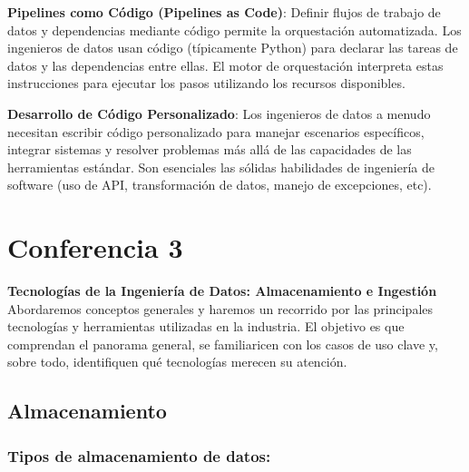 \documentclass[12pt]{book}
\begin{document}
\textbf{Pipelines como Código (Pipelines as Code)}: Definir flujos de trabajo de datos y dependencias mediante código permite la orquestación automatizada. Los ingenieros de datos usan código (típicamente Python) para declarar las tareas de datos y las dependencias entre ellas. El motor de orquestación interpreta estas instrucciones para ejecutar los pasos utilizando los recursos disponibles.

\textbf{Desarrollo de Código Personalizado}: Los ingenieros de datos a menudo necesitan escribir código personalizado para manejar escenarios específicos, integrar sistemas y resolver problemas más allá de las capacidades de las herramientas estándar. Son esenciales las sólidas habilidades de ingeniería de software (uso de API, transformación de datos, manejo de excepciones, etc).
\chapter{Conferencia 3}
\normalfont\LARGE \textbf{Tecnologías de la Ingeniería de Datos: Almacenamiento e Ingestión}
\normalfont\small\\

Abordaremos conceptos generales y haremos un recorrido por las principales tecnologías y herramientas utilizadas en la industria.
El objetivo es que comprendan el panorama general, se familiaricen con los casos de uso clave y, sobre todo, identifiquen qué tecnologías merecen su atención.

\section{Almacenamiento}
\subsection{Tipos de almacenamiento de datos:}
\end{document}
